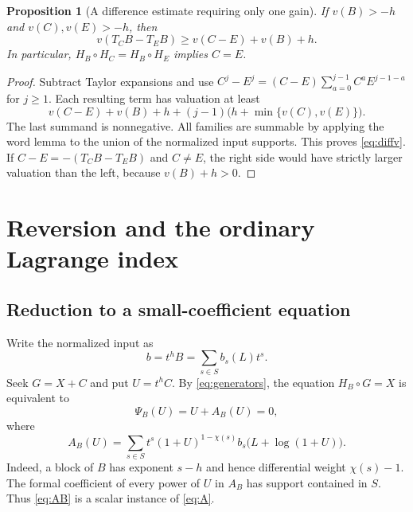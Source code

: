 \documentclass[11pt,a4paper]{article}
\newtheorem{proposition}[theorem]{Proposition}
\theoremstyle{definition}
\theoremstyle{remark}
\begin{document}
\begin{proposition}[A difference estimate requiring only one gain]
\label{prop:difference}
If $v(B)>-h$ and $v(C),v(E)>-h$, then
\begin{equation}\label{eq:diffv}
 v(T_CB-T_EB)\ge v(C-E)+v(B)+h.
\end{equation}
In particular, $H_B\circ H_C=H_B\circ H_E$ implies $C=E$.
\end{proposition}
\begin{proof}
Subtract Taylor expansions and use
$C^j-E^j=(C-E)\sum_{a=0}^{j-1}C^aE^{j-1-a}$ for $j\ge1$.
Each resulting term has valuation at least
\[
 v(C-E)+v(B)+h
 +(j-1)\bigl(h+\min\{v(C),v(E)\}\bigr).
\]
The last summand is nonnegative. All families are summable by applying the
word lemma to the union of the normalized input supports. This proves
\eqref{eq:diffv}. If $C-E=-(T_CB-T_EB)$ and $C\ne E$, the right side would
have strictly larger valuation than the left, because $v(B)+h>0$.
\end{proof}

\section{Reversion and the ordinary Lagrange index}
\label{sec:reversion}

\subsection{Reduction to a small-coefficient equation}
Write the normalized input as
\begin{equation}\label{eq:binput}
 b=t^hB=\sum_{s\in S}b_s(L)t^s.
\end{equation}
Seek $G=X+C$ and put $U=t^hC$. By \eqref{eq:generators}, the equation
$H_B\circ G=X$ is equivalent to
\begin{equation}\label{eq:normalinverse}
 \Psi_B(U)=U+A_B(U)=0,
\end{equation}
where
\begin{equation}\label{eq:AB}
 A_B(U)=\sum_{s\in S}t^s(1+U)^{1-\chi(s)}
                    b_s\bigl(L+\log(1+U)\bigr).
\end{equation}
Indeed, a block of $B$ has exponent $s-h$ and hence differential weight
$\chi(s)-1$. The formal coefficient of every power of $U$ in $A_B$ has
support contained in $S$. Thus \eqref{eq:AB} is a scalar instance of
\eqref{eq:A}.
\end{document}
